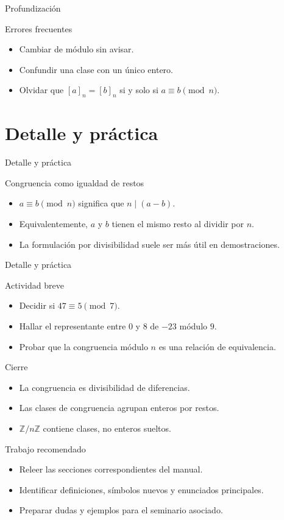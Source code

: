 \documentclass[aspectratio=169,11pt]{beamer}
\begin{document}
\begin{frame}{Profundización}
\begin{block}{Errores frecuentes}
\begin{itemize}
  \item Cambiar de módulo sin avisar.
  \item Confundir una clase con un único entero.
  \item Olvidar que \([a]_n=[b]_n\) si y solo si \(a\equiv b\pmod n\).
\end{itemize}
\end{block}
\end{frame}


\section{Detalle y práctica}

\begin{frame}{Detalle y práctica}
\begin{block}{Congruencia como igualdad de restos}
\begin{itemize}
  \item \(a\equiv b \pmod n\) significa que \(n\mid(a-b)\).
  \item Equivalentemente, \(a\) y \(b\) tienen el mismo resto al dividir por \(n\).
  \item La formulación por divisibilidad suele ser más útil en demostraciones.
\end{itemize}
\end{block}
\end{frame}

\begin{frame}{Detalle y práctica}
\begin{block}{Actividad breve}
\begin{itemize}
  \item Decidir si \(47\equiv 5 \pmod 7\).
  \item Hallar el representante entre \(0\) y \(8\) de \(-23\) módulo \(9\).
  \item Probar que la congruencia módulo \(n\) es una relación de equivalencia.
\end{itemize}
\end{block}
\end{frame}

\begin{frame}{Cierre}
\begin{itemize}
  \item La congruencia es divisibilidad de diferencias.
  \item Las clases de congruencia agrupan enteros por restos.
  \item \(\mathbb{Z}/n\mathbb{Z}\) contiene clases, no enteros sueltos.
\end{itemize}
\end{frame}

\begin{frame}{Trabajo recomendado}
\begin{itemize}
  \item Releer las secciones correspondientes del manual.
  \item Identificar definiciones, símbolos nuevos y enunciados principales.
  \item Preparar dudas y ejemplos para el seminario asociado.
\end{itemize}
\end{frame}
\end{document}
